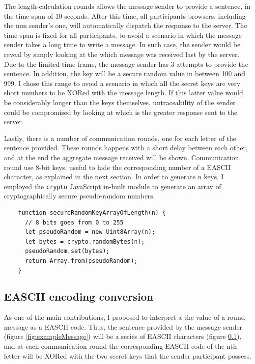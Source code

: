 The length-calculation rounds allows the message sender to provide a sentence, in the time span of 10 seconds. After this time, all participants browsers, including the non sender's one, will automatically dispatch the response to the server. The time span is fixed for all participants, to avoid a scenario in which the message sender takes a long time to write a message. In such case, the sender would be reveal by simply looking at the which message was received last by the server. Due to the limited time frame, the message sender has 3 attempts to provide the sentence. In addition, the key will be a secure random value in between 100 and 999. I chose this range to avoid a scenario in which all the secret keys are very short numbers to be XORed with the message length. If this latter value would be considerably longer than the keys themselves, untraceability of the sender could be compromised by looking at which is the greater response sent to the server. 

Lastly, there is a number of communication rounds, one for each letter of the sentence provided. These rounds happens with a short delay between each other, and at the end the aggregate message received will be shown. Communication round use 8-bit keys, useful to hide the corresponding number of a EASCII character, as explained in the next section. In order to generate n keys, I employed the \lstinline{crypto} JavaScript in-built module to generate an array of cryptographically secure pseudo-random numbers.

\begin{lstlisting}
    function secureRandomKeyArrayOfLength(n) {
      // 8 bits goes from 0 to 255
      let pseudoRandom = new Uint8Array(n);
      let bytes = crypto.randomBytes(n);
      pseudoRandom.set(bytes);
      return Array.from(pseudoRandom);
    }
\end{lstlisting}


\subsection{EASCII encoding conversion}
As one of the main contributions, I proposed to interpret a the value of a round message as a EASCII code. Thus, the sentence provided by the message sender (figure \ref{fig:exampleMessage}) will be a series of EASCII characters (figure \ref{}), and at each communication round the corresponding EASCII code of the nth letter will be XORed with the two secret keys that the sender participant possess.

